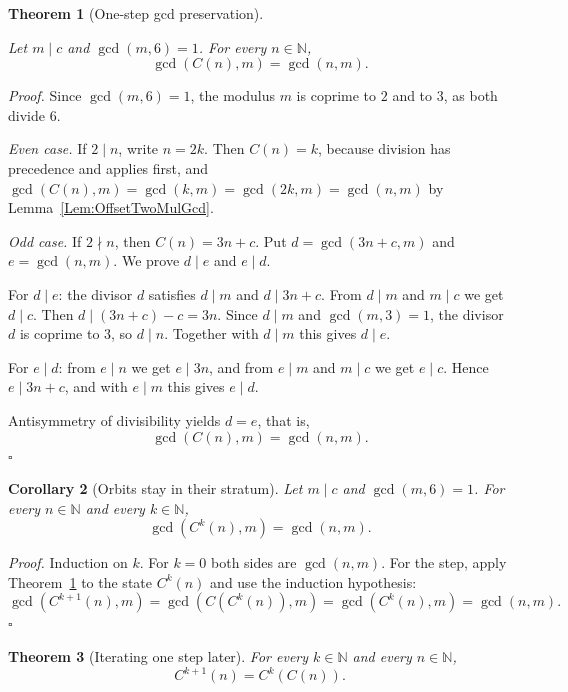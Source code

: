 \documentclass[11pt,letterpaper]{article}
\newcommand{\N}{\mathbb{N}}
\newtheorem{theorem}{Theorem}
\newtheorem{corollary}[theorem]{Corollary}
\newenvironment{proof}{\noindent\textit{Proof.}}{\hfill\(\square\)}
\begin{document}
\begin{theorem}[One-step gcd preservation]\label{Thm:OffsetStepGcd}
\leavevmode\par
Let $m\mid c$ and $\gcd(m,6)=1$. For every $n\in\N$,
\[
 \gcd(C(n),m)=\gcd(n,m).
\]
\end{theorem}

\begin{proof}
Since $\gcd(m,6)=1$, the modulus $m$ is coprime to $2$ and to $3$, as both
divide $6$.

\emph{Even case.} If $2\mid n$, write $n=2k$. Then $C(n)=k$, because division
has precedence and applies first, and
$\gcd(C(n),m)=\gcd(k,m)=\gcd(2k,m)=\gcd(n,m)$ by Lemma~\ref{Lem:OffsetTwoMulGcd}.

\emph{Odd case.} If $2\nmid n$, then $C(n)=3n+c$. Put $d=\gcd(3n+c,m)$ and
$e=\gcd(n,m)$. We prove $d\mid e$ and $e\mid d$.

For $d\mid e$: the divisor $d$ satisfies $d\mid m$ and $d\mid 3n+c$. From
$d\mid m$ and $m\mid c$ we get $d\mid c$. Then $d\mid(3n+c)-c=3n$. Since
$d\mid m$ and $\gcd(m,3)=1$, the divisor $d$ is coprime to $3$, so $d\mid n$.
Together with $d\mid m$ this gives $d\mid e$.

For $e\mid d$: from $e\mid n$ we get $e\mid 3n$, and from $e\mid m$ and
$m\mid c$ we get $e\mid c$. Hence $e\mid 3n+c$, and with $e\mid m$ this gives
$e\mid d$.

Antisymmetry of divisibility yields $d=e$, that is,
\[
\gcd(C(n),m)=\gcd(n,m).
\]
\end{proof}

\begin{corollary}[Orbits stay in their stratum]\label{Cor:OffsetOrbitStratum}
Let $m\mid c$ and $\gcd(m,6)=1$. For every $n\in\N$ and every $k\in\N$,
\[
 \gcd(C^{k}(n),m)=\gcd(n,m).
\]
\end{corollary}

\begin{proof}
Induction on $k$. For $k=0$ both sides are $\gcd(n,m)$. For the step, apply
Theorem~\ref{Thm:OffsetStepGcd} to the state $C^{k}(n)$ and use the induction
hypothesis:
\[
 \gcd(C^{k+1}(n),m)=\gcd(C(C^{k}(n)),m)=\gcd(C^{k}(n),m)=\gcd(n,m).
\]
\end{proof}

\begin{theorem}[Iterating one step later]\label{Thm:OffsetIterateSuccFirst}
For every $k\in\N$ and every $n\in\N$,
\[
 C^{k+1}(n)=C^{k}(C(n)).
\]
\end{theorem}
\end{document}

